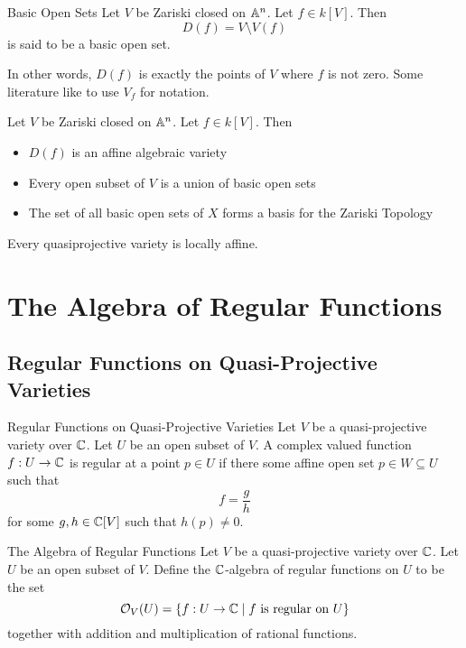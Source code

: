 \documentclass[a4paper]{article}
\begin{document}
\begin{defn}{Basic Open Sets}{} Let $V$ be Zariski closed on $\mathbb{A}^n$. Let $f\in k[V]$. Then $$D(f)=V\setminus V(f)$$ is said to be a basic open set. 
\end{defn}

In other words, $D(f)$ is exactly the points of $V$ where $f$ is not zero. Some literature like to use $V_f$ for notation. 

\begin{prp}{}{} Let $V$ be Zariski closed on $\mathbb{A}^n$. Let $f\in k[V]$. Then 
\begin{itemize}
\item $D(f)$ is an affine algebraic variety
\item Every open subset of $V$ is a union of basic open sets
\item The set of all basic open sets of $X$ forms a basis for the Zariski Topology
\end{itemize}
\end{prp}

\begin{prp}{}{} Every quasiprojective variety is locally affine. 
\end{prp}

\pagebreak
\section{The Algebra of Regular Functions}
\subsection{Regular Functions on Quasi-Projective Varieties}
\begin{defn}{Regular Functions on Quasi-Projective Varieties}{} Let $V$ be a quasi-projective variety over $\mathbb{C}$. Let $U$ be an open subset of $V$. A complex valued function $f:U\to\mathbb{C}$ is regular at a point $p\in U$ if there some affine open set $p\in W\subseteq U$ such that $$f=\frac{g}{h}$$ for some $g,h\in\mathbb{C}[V]$ such that $h(p)\neq 0$. 
\end{defn}

\begin{defn}{The Algebra of Regular Functions}{} Let $V$ be a quasi-projective variety over $\mathbb{C}$. Let $U$ be an open subset of $V$. Define the $\mathbb{C}$-algebra of regular functions on $U$ to be the set $$\mathcal{O}_V(U)=\{f:U\to\mathbb{C}\;|\;f\text{ is regular on }U\}$$ together with addition and multiplication of rational functions. 
\end{defn}
\end{document}
